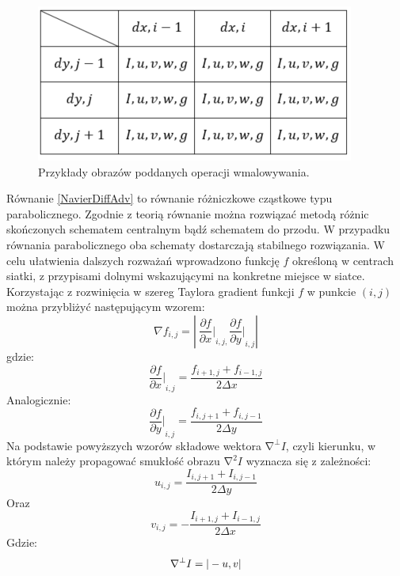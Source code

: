 \documentclass[12pt, twoside, openany]{report}
\theoremstyle{definition}
\begin{document}
\begin{figure}[!h]
	\centering
	\includegraphics[scale=0.7]{rysunki/fig2}
	\caption{Przykłady obrazów poddanych operacji wmalowywania.}
	\label{3_fig2}
\end{figure}
Równanie \eqref{NavierDiffAdv} to równanie różniczkowe cząstkowe typu parabolicznego. Zgodnie z teorią równanie można rozwiązać metodą różnic skończonych schematem centralnym bądź schematem do przodu. W przypadku równania parabolicznego oba schematy dostarczają stabilnego rozwiązania. W celu ułatwienia dalszych rozważań wprowadzono funkcję $f$ określoną w centrach siatki, z przypisami dolnymi wskazującymi na konkretne miejsce w siatce. Korzystając z rozwinięcia w szereg Taylora gradient funkcji $f$ w punkcie $(i,j)$  można przybliżyć następującym wzorem:
\begin{equation}
\nabla f_{i,j}=\left|\ {\frac{\partial f}{\partial x}|}_{i,j,}{\frac{\partial f}{\partial y}|}_{i,j}\right|
\label{gradF}
\end{equation}
gdzie:
\begin{equation}
{\frac{\partial f}{\partial x}|}_{i,j}=\frac{f_{i+1,j}+f_{i-1,j}}{2\Delta x}
\label{dfdx}
\end{equation}
Analogicznie:
\begin{equation}
{\frac{\partial f}{\partial y}|}_{i,j}=\frac{f_{i,j+1}+f_{i,j-1}}{2\Delta y}
\label{dfdy}
\end{equation}
Na podstawie powyższych wzorów składowe wektora ${\mathrm{\nabla }}^{\bot }I$, czyli kierunku, w którym należy propagować smukłość obrazu ${\mathrm{\nabla }}^2I$ wyznacza się z zależności:
\begin{equation}
u_{i,j}=\frac{I_{i,j+1}+I_{i,j-1}}{2\Delta y} 
\label{u}
\end{equation}
Oraz
\begin{equation}
 v_{i,j}=-\frac{I_{i+1,j}+I_{i-1,j}}{2\Delta x}
\label{v}
\end{equation}
Gdzie:
\begin{equation}\\
{\mathrm{\nabla }}^{\bot }I=|-u,v|
\label{gradI}
\end{equation}
\end{document}
